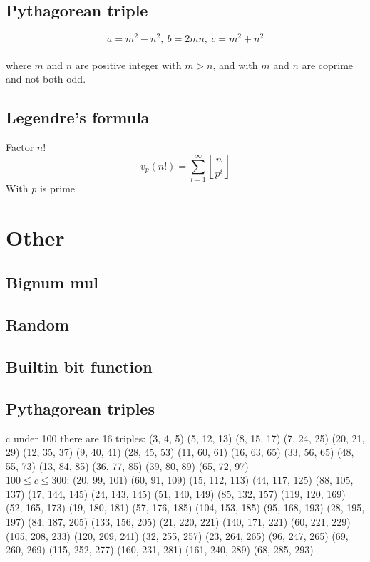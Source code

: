 \documentclass[A4 paper, 12pt, oneside]{article}
\begin{document}
\begin{multicols}{2}
	\subsection{Pythagorean triple}
	\[a = m^2 - n^2, \ b = 2mn, \ c = m^2 + n^2 \] \\
	where $m$ and $n$ are positive integer with $m > n$, and with $m$ and $n$ are coprime and not both odd.
	
	\subsection{Legendre's formula}
	Factor $n!$
	\[v_p(n!) = \sum_{i = 1}^{\infty} \left \lfloor \frac{n}{p ^ i} \right \rfloor \]
	With $p$ is prime

\section{Other}
	\subsection{Bignum mul}
	
	
	\subsection{Random}
	
	
	\subsection{Builtin bit function}
	
	
	\subsection{Pythagorean triples}
	c under 100 there are 16 triples:
	(3, 4, 5)	(5, 12, 13)	(8, 15, 17)	(7, 24, 25)
(20, 21, 29)	(12, 35, 37)	(9, 40, 41)	(28, 45, 53)
(11, 60, 61)	(16, 63, 65)	(33, 56, 65)	(48, 55, 73)
(13, 84, 85)	(36, 77, 85)	(39, 80, 89)	(65, 72, 97) \\

	$100 \leq c \leq 300$:
	(20, 99, 101)	(60, 91, 109)	(15, 112, 113)	(44, 117, 125)
(88, 105, 137)	(17, 144, 145)	(24, 143, 145)	(51, 140, 149)
(85, 132, 157)	(119, 120, 169)	(52, 165, 173)	(19, 180, 181)
(57, 176, 185)	(104, 153, 185)	(95, 168, 193)	(28, 195, 197)
(84, 187, 205)	(133, 156, 205)	(21, 220, 221)	(140, 171, 221)
(60, 221, 229)	(105, 208, 233)	(120, 209, 241)	(32, 255, 257)
(23, 264, 265)	(96, 247, 265)	(69, 260, 269)	(115, 252, 277)
(160, 231, 281)	(161, 240, 289)	(68, 285, 293)


\end{multicols}
\end{document}

